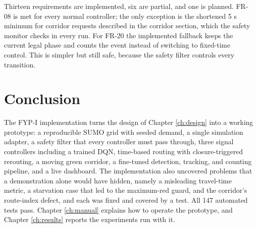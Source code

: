 Thirteen requirements are implemented, six are partial, and one is planned. FR-08 is met for every normal controller; the only exception is the shortened 5 s minimum for corridor requests described in the corridor section, which the safety monitor checks in every run. For FR-20 the implemented fallback keeps the current legal phase and counts the event instead of switching to fixed-time control. This is simpler but still safe, because the safety filter controls every transition.

\section{Conclusion}

The FYP-I implementation turns the design of Chapter \ref{ch:design} into a working prototype: a reproducible SUMO grid with seeded demand, a single simulation adapter, a safety filter that every controller must pass through, three signal controllers including a trained DQN, time-based routing with closure-triggered rerouting, a moving green corridor, a fine-tuned detection, tracking, and counting pipeline, and a live dashboard. The implementation also uncovered problems that a demonstration alone would have hidden, namely a misleading travel-time metric, a starvation case that led to the maximum-red guard, and the corridor's route-index defect, and each was fixed and covered by a test. All 147 automated tests pass. Chapter \ref{ch:manual} explains how to operate the prototype, and Chapter \ref{ch:results} reports the experiments run with it.
